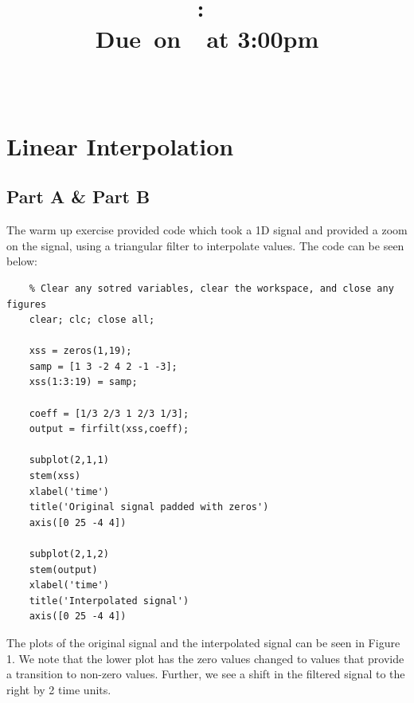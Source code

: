 \documentclass{article}
\title{
    \vspace{2in}
    \textmd{\textbf{\hmwkClass:\ \hmwkTitle}}\\
    \normalsize\vspace{0.1in}\small{Due\ on\ \hmwkDueDate\ at 3:00pm}\\
    \vspace{0.1in}\large{\textit{\hmwkClassInstructor\ \hmwkClassTime}}
    \vspace{3in}
}
\author{\textbf{\hmwkAuthorName}}
\date{}
\begin{document}
\maketitle

\pagebreak

\section{Linear Interpolation}

\subsection{Part A \& Part B}

The warm up exercise provided code which took a 1D signal and provided a zoom on the signal, using a triangular filter to interpolate values. The code can be seen below:
\begin{lstlisting}
	% Clear any sotred variables, clear the workspace, and close any figures
	clear; clc; close all;
	
	xss = zeros(1,19);
	samp = [1 3 -2 4 2 -1 -3];
	xss(1:3:19) = samp;
	
	coeff = [1/3 2/3 1 2/3 1/3];
	output = firfilt(xss,coeff);
	
	subplot(2,1,1)
	stem(xss)
	xlabel('time')
	title('Original signal padded with zeros')
	axis([0 25 -4 4])
	
	subplot(2,1,2)
	stem(output)
	xlabel('time')
	title('Interpolated signal')
	axis([0 25 -4 4])
\end{lstlisting}

The plots of the original signal and the interpolated signal can be seen in Figure 1. We note that the lower plot has the zero values changed to values that provide a transition to non-zero values. Further, we see a shift in the filtered signal to the right by 2 time units.
\end{document}
